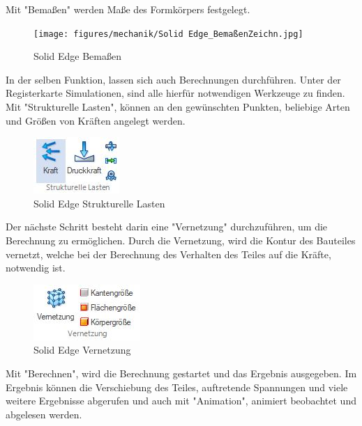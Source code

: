 Mit "Bemaßen" werden Maße des Formkörpers festgelegt.


\begin{figure} [H]
	\begin{center}
		\texttt{[image: figures/mechanik/Solid Edge\_BemaßenZeichn.jpg]}
			\caption{Solid Edge Bemaßen}
			\label{fig:Solid Edge Bemaßen}
	\end{center}
\end{figure}


In der selben Funktion, lassen sich auch Berechnungen durchführen.
Unter der Registerkarte Simulationen, sind alle hierfür notwendigen Werkzeuge zu finden.
Mit "Strukturelle Lasten", können an den gewünschten Punkten, beliebige Arten und Größen von Kräften angelegt werden. 


\begin{figure} [H]
	\begin{center}
		\includegraphics[scale=0.4]{figures/mechanik/Solid Edge_Strukturelle Lasten.jpg}
			\caption{Solid Edge Strukturelle Lasten}
			\label{fig:Solid Edge Strukturelle Lasten}
	\end{center}
\end{figure}


Der nächste Schritt besteht darin eine "Vernetzung" durchzuführen, um die Berechnung zu ermöglichen. Durch die Vernetzung, wird die Kontur des Bauteiles vernetzt, welche bei der Berechnung des Verhalten des Teiles auf die Kräfte, notwendig ist. 


\begin{figure} [H]
	\begin{center}
		\includegraphics[scale=0.4]{figures/mechanik/Solid Edge_Vernetzung.jpg}
			\caption{Solid Edge Vernetzung}
			\label{fig:Solid Edge Vernetzung}
	\end{center}
\end{figure}


Mit "Berechnen", wird die Berechnung gestartet und das Ergebnis ausgegeben.
Im Ergebnis können die Verschiebung des Teiles, auftretende Spannungen und viele weitere Ergebnisse abgerufen und auch mit "Animation", animiert beobachtet und abgelesen werden. 


